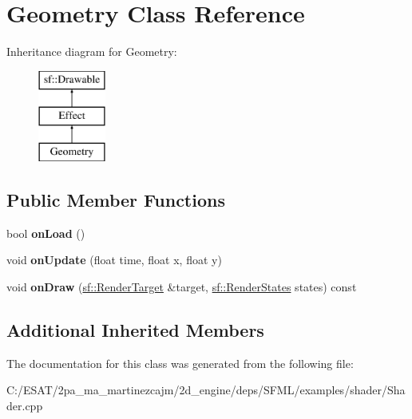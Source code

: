 \hypertarget{class_geometry}{}\section{Geometry Class Reference}
\label{class_geometry}
Inheritance diagram for Geometry\+:\begin{figure}[H]
\begin{center}
\leavevmode
\includegraphics[height=3.000000cm]{class_geometry}
\end{center}
\end{figure}
\subsection*{Public Member Functions}
\begin{DoxyCompactItemize}
\item 
\mbox{\label{class_geometry_a2282e16f6c9c7362350b5066d187ae34}} 
bool {\bfseries on\+Load} ()
\item 
\mbox{\label{class_geometry_a04ed5bfc73b07d2547e532d42bcd93e7}} 
void {\bfseries on\+Update} (float time, float x, float y)
\item 
\mbox{\label{class_geometry_ab6112c3c25ca6dc914f1e6922724a6a7}} 
void {\bfseries on\+Draw} (\hyperlink{classsf_1_1_render_target}{sf\+::\+Render\+Target} \&target, \hyperlink{classsf_1_1_render_states}{sf\+::\+Render\+States} states) const
\end{DoxyCompactItemize}
\subsection*{Additional Inherited Members}


The documentation for this class was generated from the following file\+:\begin{DoxyCompactItemize}
\item 
C\+:/\+E\+S\+A\+T/2pa\+\_\+ma\+\_\+martinezcajm/2d\+\_\+engine/deps/\+S\+F\+M\+L/examples/shader/Shader.\+cpp\end{DoxyCompactItemize}
